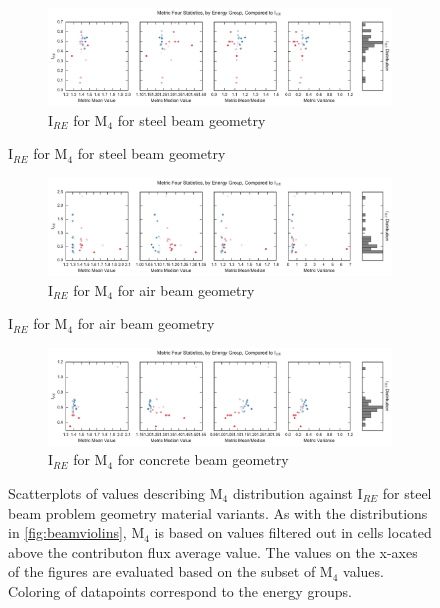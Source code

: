 \begin{figure}[htb!]
  \centering
  \begin{subfigure}[t]{\textwidth}
    \includegraphics[width=\linewidth]{./chapters/characterization_probs/figures/char/prob_1/metric_four_err_stats_mean.pdf}
    \caption{I$_{RE}$ for M$_4$ for steel beam geometry}
    \label{fig:beamsteelIRE}
  \end{subfigure}
\end{figure}
\begin{figure}[htb!]\ContinuedFloat
  \centering
  \begin{subfigure}[t]{\textwidth}
    \includegraphics[width=\linewidth]{./chapters/characterization_probs/figures/char/prob1v1/metric_four_err_stats_mean.pdf}
    \caption{I$_{RE}$ for M$_4$ for air beam geometry}
    \label{fig:beamairIRE}
  \end{subfigure}
\end{figure}
\begin{figure}[htb!]\ContinuedFloat
  \centering
  \begin{subfigure}[t]{\textwidth}
    \includegraphics[width=\linewidth]{./chapters/characterization_probs/figures/char/prob1v2/metric_four_err_stats_mean.pdf}
    \caption{I$_{RE}$ for M$_4$ for concrete beam geometry}
    \label{fig:beamconcreteIRE}
  \end{subfigure}
  \caption[Scatterplots of values describing M$_4$ distribution against I$_{RE}$
  for steel beam problem geometry material variants.]{Scatterplots of values
    describing M$_4$ distribution against I$_{RE}$ for steel beam problem
    geometry material variants. As with the distributions in
    \ref{fig:beamviolins}, M$_4$ is based on values filtered out in cells
  located above the contributon flux average value. The values on the x-axes of
the figures are evaluated based on the subset of M$_4$ values. Coloring of
datapoints correspond to the energy groups.}
  \label{fig:beamIREs}
\end{figure}

